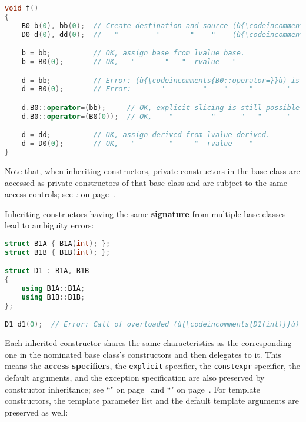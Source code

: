 \begin{lstlisting}[language=C++]
void f()
{
    B0 b(0), bb(0);  // Create destination and source (ù{\codeincomments{B0}}ù) objects.
    D0 d(0), dd(0);  //   "         "       "    "    (ù{\codeincomments{D0}}ù)    ".

    b = bb;          // OK, assign base from lvalue base.
    b = B0(0);       // OK,   "       "   "  rvalue   "

    d = bb;          // Error: (ù{\codeincomments{B0::operator=}}ù) is hidden by (ù{\codeincomments{D0::operator=}}ù).
    d = B0(0);       // Error:       "         "    "     "        "

    d.B0::operator=(bb);     // OK, explicit slicing is still possible.
    d.B0::operator=(B0(0));  // OK,    "         "      "   "      "

    d = dd;          // OK, assign derived from lvalue derived.
    d = D0(0);       // OK,   "        "     "  rvalue    "
}
\end{lstlisting}

\noindent Note that, when inheriting constructors, private constructors in the
base class are accessed as private constructors of that base class and
are subject to the same access controls; see \textit{: } on page~\pageref{access-levels-of-inherited-constructors-are-same-as-in-base-class}.

Inheriting constructors having the same \textbf{signature} from multiple
base classes lead to ambiguity errors:

\begin{lstlisting}[language=C++]
struct B1A { B1A(int); };
struct B1B { B1B(int); };

struct D1 : B1A, B1B
{
    using B1A::B1A;
    using B1B::B1B;
};

D1 d1(0);  // Error: Call of overloaded (ù{\codeincomments{D1(int)}}ù) is ambiguous.
\end{lstlisting}

\noindent Each inherited constructor shares the same characteristics as the
corresponding one in the nominated base class's constructors and then
delegates to it. This means the \textbf{access specifiers}, the
\texttt{explicit} specifier, the \texttt{constexpr} specifier, the
default arguments, and the exception specification are also preserved by
constructor inheritance; see ``" on page~\pageref{noexcept} and ``" on page~\pageref{constexprfunc}. For template
constructors, the template parameter list and the default template
arguments are preserved as well:

